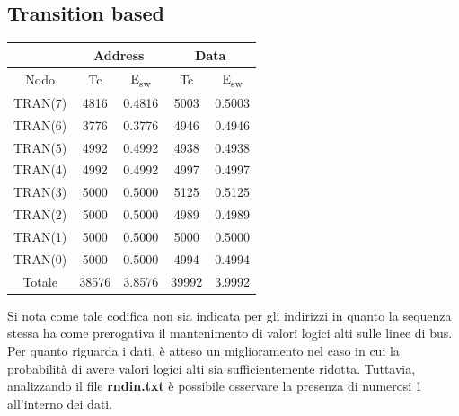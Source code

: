 \documentclass[11pt,  english, makeidx, a4paper, titlepage, oneside]{book}
\begin{document}
\subsection{Transition based}
\begin{center}
	\begin{tabular}{|c|c|c||c|c|}
	\hline
	& \multicolumn{2}{c}{Address} & \multicolumn{2}{c}{Data}\\
	\hline
	Nodo & Tc & E\textsubscript{sw} & Tc & E\textsubscript{sw} \\
	\hline
	TRAN(7) & 4816 & 0.4816 & 5003 & 0.5003\\
	 \hline
	TRAN(6) & 3776 & 0.3776 & 4946 & 0.4946\\
	\hline
	TRAN(5) & 4992 & 0.4992 & 4938 & 0.4938\\
	\hline
	TRAN(4) & 4992 & 0.4992 & 4997 & 0.4997\\
	\hline
	TRAN(3) & 5000 & 0.5000 & 5125 & 0.5125\\
	\hline
	TRAN(2) & 5000 & 0.5000 & 4989 & 0.4989\\
	\hline
	TRAN(1) & 5000 & 0.5000 & 5000 &0.5000 \\
	\hline
	TRAN(0) & 5000 & 0.5000 & 4994 & 0.4994\\
	\hline
	Totale & 38576 & 3.8576 & 39992 & 3.9992\\
	\hline
	\end{tabular}	
\end{center}
\vspace{0.3cm}
Si nota come tale codifica non sia indicata per gli indirizzi in quanto la sequenza stessa ha come prerogativa il mantenimento di valori logici alti sulle linee di bus.
\\
Per quanto riguarda i dati, è atteso un miglioramento nel caso in cui la probabilità di avere valori logici alti sia sufficientemente ridotta. Tuttavia, analizzando il file \textbf{rndin.txt} è possibile osservare la presenza di numerosi 1 all'interno dei dati.
\end{document}
